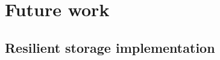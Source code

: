 \documentclass{llncs}
\begin{document}
\section{Future work}


\subsection{Resilient storage implementation}
\end{document}

